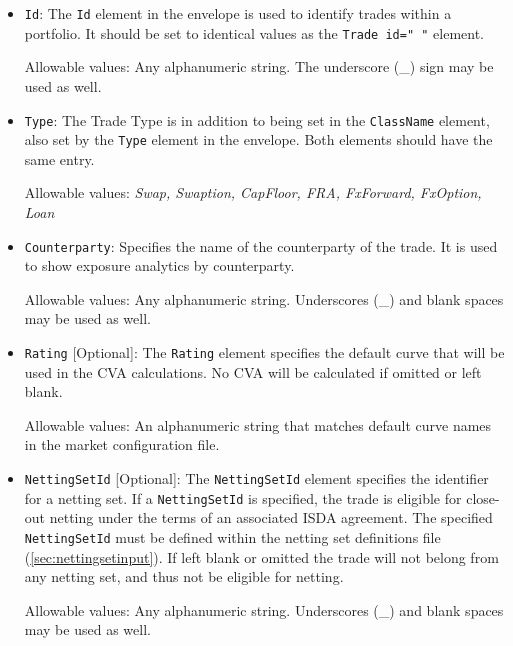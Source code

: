 \begin{itemize}
\item {\tt Id}: The {\tt Id} element in the envelope is used to identify trades within a portfolio. It should be set to identical values as the {\tt Trade id="   "} element.



Allowable values: Any alphanumeric string. The underscore (\_) sign may be used as well.

\item {\tt Type}: The Trade Type is in addition to being set in the {\tt ClassName} element, also set by the {\tt Type} element in the envelope. Both elements should have the same entry.



Allowable values: \emph{Swap, Swaption, CapFloor, FRA, FxForward, FxOption, Loan}

\item {\tt Counterparty}: Specifies the name of the counterparty of the trade.  It is used to show exposure analytics by counterparty. 



Allowable values: Any alphanumeric string. Underscores (\_) and blank spaces may be used as well. 

\item {\tt Rating} [Optional]: The {\tt Rating} element specifies the default curve that will be used in the CVA calculations.  No CVA will be calculated if omitted or left blank.
\vspace{1em}

Allowable values: An alphanumeric string that matches default curve names in the market configuration file.  

\item {\tt NettingSetId} [Optional]: The
  {\tt NettingSetId} element specifies the identifier for a
  netting set. If a \lstinline!NettingSetId! is specified, the trade
  is eligible for close-out netting under the terms of an associated
  ISDA agreement. The specified {\tt NettingSetId} must be
  defined within the netting set definitions file (\ref{sec:nettingsetinput}). If left blank or omitted the trade will not belong from any netting set, and thus not be eligible for netting.



Allowable values: Any alphanumeric string. Underscores (\_) and blank spaces may be used as well. 



\end{itemize}
